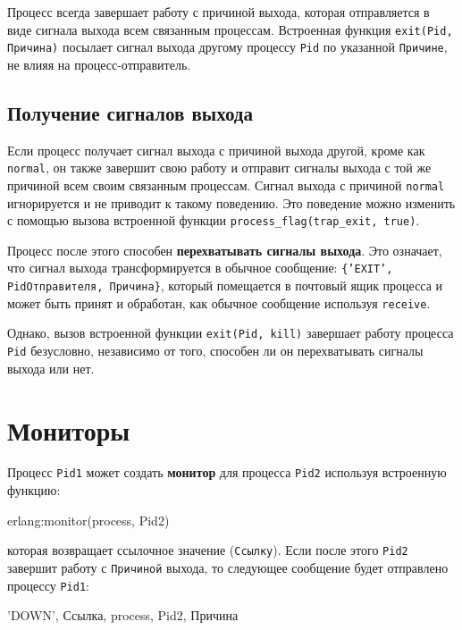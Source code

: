 Процесс всегда завершает работу с причиной выхода, которая отправляется в виде
сигнала выхода всем связанным процессам. Встроенная функция \texttt{exit(Pid, 
Причина)} посылает сигнал выхода другому процессу \texttt{Pid} по указанной
\texttt{Причине}, не влияя на процесс-отправитель.


\subsection{Получение сигналов выхода}
\label{processes:recvexitsignals}

Если процесс получает сигнал выхода с причиной выхода другой, кроме 
как\linebreak
\texttt{normal}, он также завершит свою работу и отправит сигналы выхода с той 
же причиной всем своим связанным процессам.  Сигнал выхода с причиной
\texttt{normal} игнорируется и не приводит к такому поведению.  Это поведение 
можно изменить с помощью вызова встроенной функции 
\texttt{process\_flag(trap\_exit, true)}.

Процесс после этого способен \textbf{перехватывать сигналы выхода}.  Это 
означает, что сигнал выхода трансформируется в обычное сообщение:
\texttt{\{'EXIT', PidОтправителя, Причина\}}, который помещается в почтовый
ящик процесса и может быть принят и обработан, как обычное сообщение используя
\texttt{receive}.

Однако, вызов встроенной функции \texttt{exit(Pid, kill)} завершает работу 
процесса \texttt{Pid} безусловно, независимо от того, способен ли он
перехватывать сигналы выхода или нет.


\section{Мониторы}

Процесс \texttt{Pid1} может создать \textbf{монитор} для процесса \texttt{Pid2} 
используя встроенную функцию:

\begin{erlang}
erlang:monitor(process, Pid2)
\end{erlang}

которая возвращает ссылочное значение (\texttt{Ссылку}). Если после этого
\texttt{Pid2} завершит работу с \texttt{Причиной} выхода, то следующее 
сообщение будет отправлено процессу \texttt{Pid1}:

\begin{erlangru}
{'DOWN', Ссылка, process, Pid2, Причина}
\end{erlangru}

